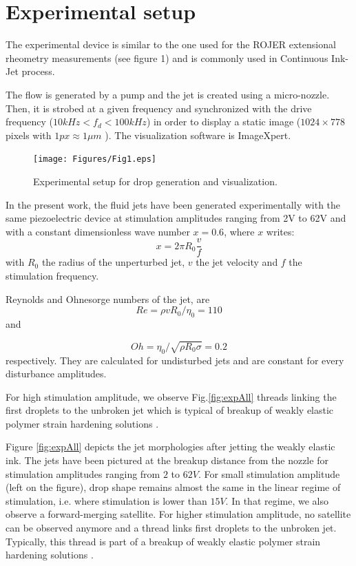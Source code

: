 \documentclass[onecolumn, 12pt]{asme2ej}
\begin{document}
\section{Experimental setup}
The experimental device is similar to the one used for the ROJER extensional rheometry measurements \cite{rodriguez2015experimental} (see figure 1) and is commonly used in Continuous Ink-Jet process. 

The flow is generated by a pump and the jet is created using a micro-nozzle. Then, it is strobed at a given frequency and synchronized with the drive frequency ($10 kHz < f_d < 100 kHz$) in order to display a static image ($1024\times778$ pixels with $1 px \approx 1 \mu m$ ). 
The visualization software is ImageXpert.

\begin{figure}[h]
    \centering
    \texttt{[image: Figures/Fig1.eps]}
    \caption{Experimental setup for drop generation and visualization.}
    \label{device}
\end{figure}

In the present work, the fluid jets have been generated experimentally with the same piezoelectric device at stimulation amplitudes ranging from 2V to 62V and with a constant dimensionless wave number $x = 0.6$, where $x$ writes:
\begin{equation}\label{eq:waveNbr}
    x=2 \pi R_0 \frac{v}{f}
\end{equation}
with $R_0$ the radius of the unperturbed jet, $v$ the jet velocity and $f$ the stimulation frequency. 

Reynolds and Ohnesorge numbers of the jet, are
\begin{equation}
    Re= \rho v R_0 / \eta_0 = 110
\end{equation} and 
   
\begin{equation}
    Oh=\eta_0/\sqrt{\rho R_0 \sigma} = 0.2
\end{equation}
respectively. They are calculated for undisturbed jets and are constant for every disturbance amplitudes.

For high stimulation amplitude, we observe Fig.\ref{fig:expAll} threads linking the first droplets to the unbroken jet which is typical of breakup of weakly elastic polymer strain hardening solutions \cite{christanti2002effect}.

Figure \ref{fig:expAll} depicts the jet morphologies after jetting the weakly elastic ink. The jets have been pictured at the breakup distance from the nozzle for stimulation amplitudes ranging from $2$ to $62V$. 
For small stimulation amplitude (left on the figure), drop shape remains almost the same in the linear regime of stimulation, i.e. where stimulation is lower than $15V$. In that regime, we also observe a forward-merging satellite. For higher stimulation amplitude, no satellite can be observed anymore and a thread links first droplets to the unbroken jet. Typically, this thread is part of a breakup of weakly elastic polymer strain hardening solutions \cite{christanti2002effect}.
\end{document}
